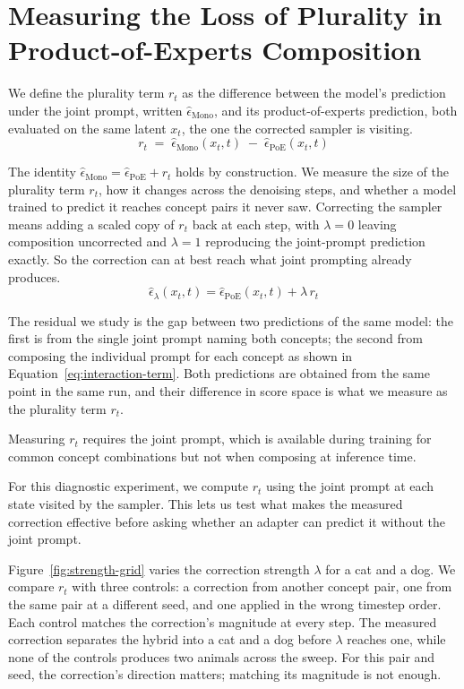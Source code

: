 \section{Measuring the Loss of Plurality in Product-of-Experts Composition}
\label{sec:interaction}

We define the plurality term $r_t$ as the difference between the model's prediction under the joint prompt, written $\hat\epsilon_{\mathrm{Mono}}$, and its product-of-experts prediction, both evaluated on the same latent $x_t$, the one the corrected sampler is visiting.
\begin{equation}
r_t \;=\; \hat\epsilon_{\mathrm{Mono}}(x_t, t) \;-\; \hat\epsilon_{\mathrm{PoE}}(x_t, t)
\label{eq:interaction-term}
\end{equation}

The identity $\hat\epsilon_{\mathrm{Mono}} = \hat\epsilon_{\mathrm{PoE}} + r_t$ holds by construction. We measure the size of the plurality term $r_t$, how it changes across the denoising steps, and whether a model trained to predict it reaches concept pairs it never saw. Correcting the sampler means adding a scaled copy of $r_t$ back at each step, with $\lambda = 0$ leaving composition uncorrected and $\lambda = 1$ reproducing the joint-prompt prediction exactly. So the correction can at best reach what joint prompting already produces.
\begin{equation}
\hat\epsilon_\lambda(x_t, t) = \hat\epsilon_{\mathrm{PoE}}(x_t, t) + \lambda\, r_t
\label{eq:corrected-sampler}
\end{equation}

The residual we study is the gap between two predictions of the same model: the first is from the single joint prompt naming both concepts; the second from composing the individual prompt for each concept as shown in Equation~\ref{eq:interaction-term}. Both predictions are obtained from the same point in the same run, and their difference in score space is what we measure as the plurality term $r_t$.

Measuring $r_t$ requires the joint prompt, which is available during training for common concept combinations but not when composing at inference time.

For this diagnostic experiment, we compute $r_t$ using the joint
prompt at each state visited by the sampler. This lets us test what
makes the measured correction effective before asking whether an
adapter can predict it without the joint prompt.

Figure~\ref{fig:strength-grid} varies the correction strength
$\lambda$ for a cat and a dog. We compare $r_t$ with three controls:
a correction from another concept pair, one from the same pair at a
different seed, and one applied in the wrong timestep order. Each
control matches the correction's magnitude at every step. The
measured correction separates the hybrid into a cat and a dog before
$\lambda$ reaches one, while none of the controls produces two
animals across the sweep. For this pair and seed, the correction's
direction matters; matching its magnitude is not enough.


